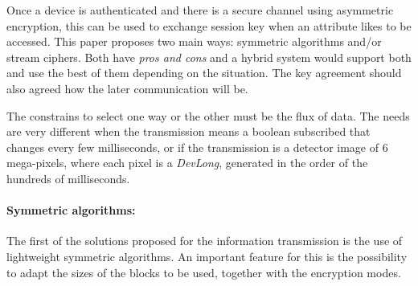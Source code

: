 \documentclass[10pt,a4paper,twoside]{llncs}
\begin{document}

Once a device is authenticated and there is a secure channel using asymmetric encryption, this can be used to exchange session key when an attribute likes to be accessed. This paper proposes two main ways: symmetric algorithms and/or stream ciphers. Both have \emph{pros and cons} and a hybrid system would support both and use the best of them depending on the situation. The key agreement should also agreed how the later communication will be.

The constrains to select one way or the other must be the flux of data. The needs are very different when the transmission means a boolean subscribed that changes every few milliseconds, or if the transmission is a detector image of 6 mega-pixels, where each pixel is a \emph{DevLong}, generated in the order of the hundreds of milliseconds.

\paragraph{Symmetric algorithms:} The first of the solutions proposed for the information transmission is the use of lightweight symmetric algorithms. An important feature for this is the possibility to adapt the sizes of the blocks to be used, together with the encryption modes.
\end{document}
